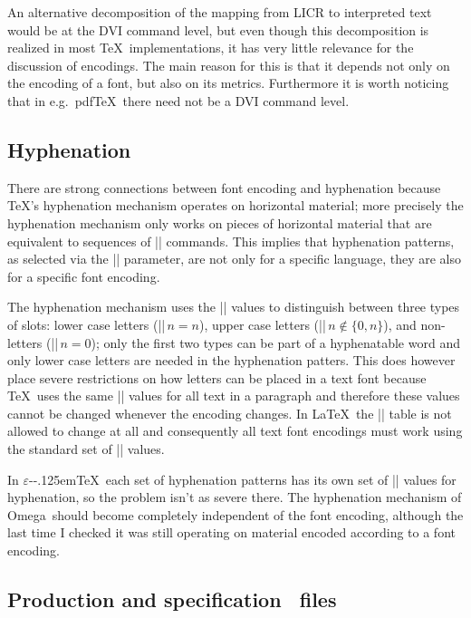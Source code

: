 \documentclass[a4paper]{article}
\DeclareRobustCommand\ETX{\textsmaller{ETX}}
\newcommand{\TeXOmega}{Omega}
\DeclareRobustCommand\eTeX{\ensuremath{\varepsilon}-\kern-.125em\TeX}
\begin{document}
An alternative decomposition of the mapping from LICR to interpreted 
text would be at the DVI command level, but even though this 
decomposition is realized in most \TeX\ implementations, it has very 
little relevance for the discussion of encodings. The main reason for 
this is that it depends not only on the encoding of a font, but 
also on its metrics. Furthermore it is worth noticing that in e.g.\ 
pdf\TeX\ there need not be a DVI command level.


\subsection{Hyphenation}

There are strong connections between font encoding and hyphenation because 
\TeX's hyphenation mechanism operates on horizontal material; more 
precisely the hyphenation mechanism only works on pieces of horizontal 
material that are equivalent to sequences of |\char| commands. This 
implies that hyphenation patterns, as selected via the |\language| 
parameter, are not only for a specific language, they are also for a 
specific font encoding.

The hyphenation mechanism uses the |\lccode| values to distinguish 
between three types of slots: lower case letters (|\lccode|\(\,n = 
n\)), upper case letters (|\lccode|\(\,n \notin \{0,n\}\)), and 
non-letters (|\lccode|\(\,n = 0\)); only the first two types can be 
part of a hyphenatable word and only lower case letters are needed 
in the hyphenation patters. This does however place severe 
restrictions on how letters can be placed in a text font because 
\TeX\ uses the same |\lccode| values for all text in a paragraph and 
therefore these values cannot be changed whenever the encoding changes. 
In \LaTeX\ the |\lccode| table is not allowed to change at all and 
consequently all text font encodings must work using the standard set 
of |\lccode| values.

In \eTeX\ each set of hyphenation patterns has its own set of 
|\lccode| values for hyphenation, so the problem isn't as severe 
there. The hyphenation mechanism of \TeXOmega\ should become 
completely independent of the font encoding, although the last time I 
checked it was still operating on material encoded according to 
a font encoding.


\subsection{Production and specification \ETX\ files}
\end{document}
